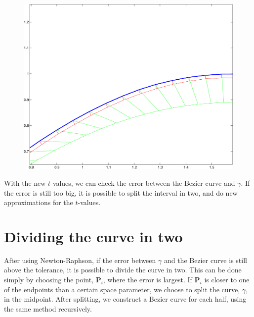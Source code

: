 \documentclass[10pt]{article}
\begin{document}
\begin{figure}
\centering
\begin{minipage}[t]{.4\textwidth}
\centering
\vspace{0pt}
    \includegraphics[scale=0.42, clip=true, trim = 0 0 0 5.5cm]{newtons3-crop.pdf}
    \label{fig:Newton-Raphson}
\end{minipage}\hfill
\begin{minipage}[t]{.4\textwidth}
\centering
\vspace{0pt}
\end{minipage}
\end{figure}


With the new $t$-values, we can check the error between the Bezier curve and $\gamma$. If the error is still too big, it is possible to split the interval in two, and do new approximations for the $t$-values.

\section*{Dividing the curve in two}
After using Newton-Raphson, if the error between $\gamma$ and the Bezier curve is still above the tolerance, it is possible to divide the curve in two. This can be done simply by choosing the point, $\mathbf{P}_i$, where the error is largest. If $\mathbf{P}_i$ is closer to one of the endpoints than a certain space parameter, we choose to split the curve, $\gamma$, in the midpoint. After splitting, we construct a Bezier curve for each half, using the same method recursively.
\end{document}
